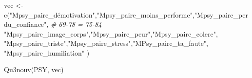 \documentclass[
]{article}
\newenvironment{Shaded}{\begin{snugshade}}{\end{snugshade}}
\newcommand{\CommentTok}[1]{\textcolor[rgb]{0.56,0.35,0.01}{\textit{#1}}}
\newcommand{\FunctionTok}[1]{\textcolor[rgb]{0.00,0.00,0.00}{#1}}
\newcommand{\NormalTok}[1]{#1}
\newcommand{\OtherTok}[1]{\textcolor[rgb]{0.56,0.35,0.01}{#1}}
\newcommand{\StringTok}[1]{\textcolor[rgb]{0.31,0.60,0.02}{#1}}
\begin{document}
\begin{Shaded}
\begin{Highlighting}[]
\NormalTok{vec }\OtherTok{\textless{}{-}} \FunctionTok{c}\NormalTok{(}\StringTok{"Mpsy\_paire\_démotivation"}\NormalTok{,}\StringTok{"Mpsy\_paire\_moins\_performe"}\NormalTok{,}\StringTok{"Mpsy\_paire\_perdu\_confiance"}\NormalTok{,  }\CommentTok{\# 69{-}78 = 75{-}84}
    \StringTok{"Mpsy\_paire\_image\_corps"}\NormalTok{,}\StringTok{"Mpsy\_paire\_peur"}\NormalTok{,}\StringTok{"Mpsy\_paire\_colere"}\NormalTok{,}
    \StringTok{"Mpsy\_paire\_triste"}\NormalTok{,}\StringTok{"Mpsy\_paire\_stress"}\NormalTok{,}\StringTok{"MPsy\_paire\_ta\_faute"}\NormalTok{,}
    \StringTok{"Mpsy\_paire\_humiliation"}\NormalTok{ )}

\FunctionTok{Qu3nouv}\NormalTok{(PSY, vec)}
\end{Highlighting}
\end{Shaded}
\end{document}
